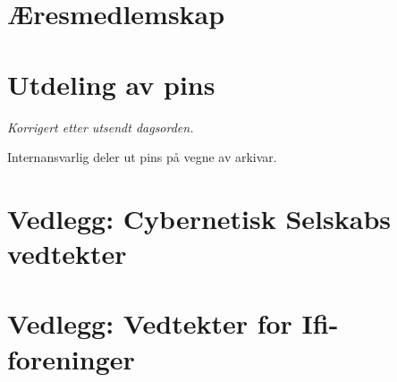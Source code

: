 \documentclass[10pt,norsk,a4paper]{article}
\begin{document}
\section{Æresmedlemskap}

\section{Utdeling av pins}
\textit{\small Korrigert etter utsendt dagsorden.}

Internansvarlig deler ut pins på vegne av arkivar.

\section*{Vedlegg: Cybernetisk Selskabs vedtekter}
\section*{Vedlegg: Vedtekter for Ifi-foreninger}\label{lastpage}


\newpage



\end{document}
